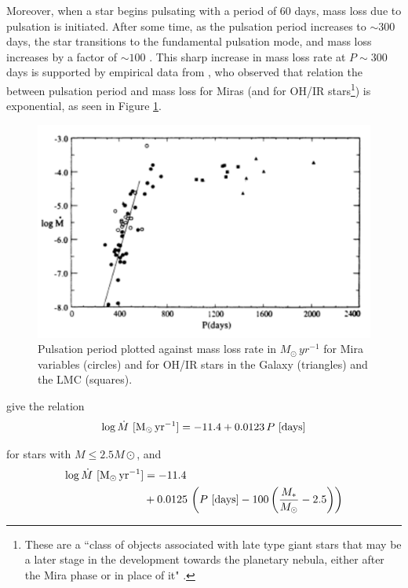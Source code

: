 \documentclass[twocolumn]{aastex63}
\begin{document}
Moreover, when a star begins pulsating with a period of 60 days, mass loss due to pulsation is initiated. After some time, as the pulsation period increases to $\sim 300$ days, the star transitions to the fundamental pulsation mode, and mass loss increases by a factor of $\sim 100$ \citep{mcdonald, bedijn}. This sharp increase in mass loss rate at $P\sim 300$ days is supported by empirical data from \cite{vassiliadis}, who observed that relation the between pulsation period and mass loss for Miras (and for OH/IR stars\footnote{These are a ``class of objects associated with late type giant stars that may be a later stage in the development towards the planetary nebula, either after the Mira phase or in place of it" \citep{pottasch}.}) is exponential, as seen in Figure \ref{fig:pulsation_massloss}.
\begin{figure}[ht]
    \includegraphics[width=\textwidth]{pulsation_massloss.png}
    \caption{Pulsation period plotted against mass loss rate in $M_\odot\,yr^{-1}$ for Mira variables (circles) and for OH/IR stars in the Galaxy (triangles) and the LMC (squares).}
    \label{fig:pulsation_massloss}
\end{figure}

\cite{vassiliadis} give the relation 
\begin{align*}
    \log \dot M~{[\rm M_\odot\,yr^{-1}]} = -11.4 + 0.0123\,P~{[\rm days]}
\end{align*}

for stars with $M\leq 2.5M\odot$, and
\begin{align*}
    \log \dot M~{[\rm M_\odot\,yr^{-1}]} &= -11.4 \\
                                         &+ 0.0125\,\left(P~{[\rm days]} - 100\left(\frac{M_*}{M_\odot} - 2.5\right)\right)
\end{align*}
\end{document}
